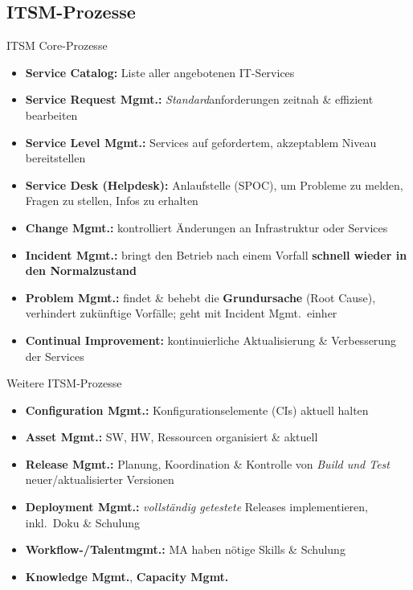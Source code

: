 \documentclass[a4paper, fontsize=7pt]{scrartcl}
\begin{document}
\subsection{ITSM-Prozesse}

\begin{mainbox}{ITSM Core-Prozesse}
\begin{itemize}
    \item \textbf{Service Catalog:} Liste aller angebotenen IT-Services
    \item \textbf{Service Request Mgmt.:} \emph{Standard}anforderungen
          zeitnah \& effizient bearbeiten
    \item \textbf{Service Level Mgmt.:} Services auf gefordertem,
          akzeptablem Niveau bereitstellen
    \item \textbf{Service Desk (Helpdesk):} Anlaufstelle (SPOC), um Probleme
          zu melden, Fragen zu stellen, Infos zu erhalten
    \item \textbf{Change Mgmt.:} kontrolliert Änderungen an Infrastruktur
          oder Services
    \item \textbf{Incident Mgmt.:} bringt den Betrieb nach einem Vorfall
          \textbf{schnell wieder in den Normalzustand}
    \item \textbf{Problem Mgmt.:} findet \& behebt die \textbf{Grundursache}
          (Root Cause), verhindert zukünftige Vorfälle; geht mit Incident
          Mgmt.\ einher
    \item \textbf{Continual Improvement:} kontinuierliche Aktualisierung \&
          Verbesserung der Services
\end{itemize}
\end{mainbox}

\begin{mainbox}{Weitere ITSM-Prozesse}
\begin{itemize}
    \item \textbf{Configuration Mgmt.:} Konfigurationselemente (CIs) aktuell
          halten
    \item \textbf{Asset Mgmt.:} SW, HW, Ressourcen organisiert \& aktuell
    \item \textbf{Release Mgmt.:} Planung, Koordination \& Kontrolle von
          \emph{Build und Test} neuer/aktualisierter Versionen
    \item \textbf{Deployment Mgmt.:} \emph{vollständig getestete} Releases
          implementieren, inkl.\ Doku \& Schulung
    \item \textbf{Workflow-/Talentmgmt.:} MA haben nötige Skills \& Schulung
    \item \textbf{Knowledge Mgmt.}, \textbf{Capacity Mgmt.}
\end{itemize}
\end{mainbox}
\end{document}

